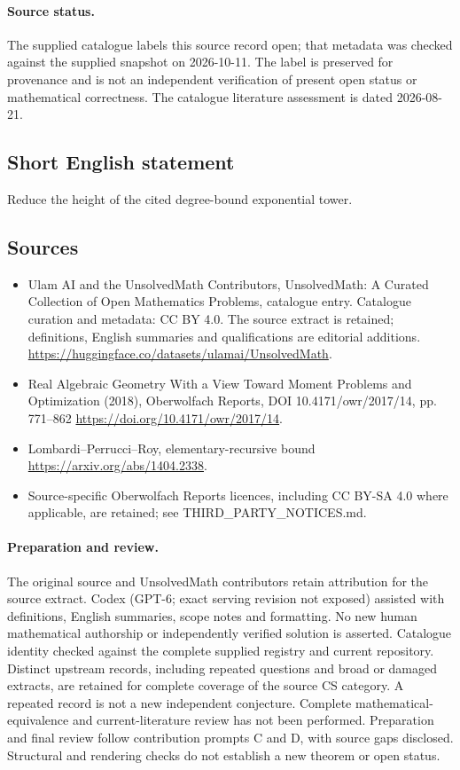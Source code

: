 \documentclass[11pt]{article}
\begin{document}
\paragraph{Source status.}
The supplied catalogue labels this source record open; that metadata was checked against the supplied snapshot on 2026-10-11. The label is preserved for provenance and is not an independent verification of present open status or mathematical correctness. The catalogue literature assessment is dated 2026-08-21.
\subsection{Short English statement}
Reduce the height of the cited degree-bound exponential tower.
\subsection{Sources}
\begin{itemize}
\item[S1] Ulam AI and the UnsolvedMath Contributors, UnsolvedMath: A Curated Collection of Open Mathematics Problems, catalogue entry. Catalogue curation and metadata: CC BY 4.0. The source extract is retained; definitions, English summaries and qualifications are editorial additions.
\url{https://huggingface.co/datasets/ulamai/UnsolvedMath}.
\item[S2] Real Algebraic Geometry With a View Toward Moment Problems and Optimization (2018), Oberwolfach Reports, DOI 10.4171/owr/2017/14, pp. 771--862
\url{https://doi.org/10.4171/owr/2017/14}.
\item[S3] Lombardi--Perrucci--Roy, elementary-recursive bound
\url{https://arxiv.org/abs/1404.2338}.
\item Source-specific Oberwolfach Reports licences, including CC BY-SA 4.0 where applicable, are retained; see THIRD\_PARTY\_NOTICES.md.
\end{itemize}
\paragraph{Preparation and review.}
The original source and UnsolvedMath contributors retain attribution for the source extract. Codex (GPT-6; exact serving revision not exposed) assisted with definitions, English summaries, scope notes and formatting. No new human mathematical authorship or independently verified solution is asserted. Catalogue identity checked against the complete supplied registry and current repository. Distinct upstream records, including repeated questions and broad or damaged extracts, are retained for complete coverage of the source CS category. A repeated record is not a new independent conjecture. Complete mathematical-equivalence and current-literature review has not been performed. Preparation and final review follow contribution prompts C and D, with source gaps disclosed. Structural and rendering checks do not establish a new theorem or open status.
\label{end:statement}
\end{document}
